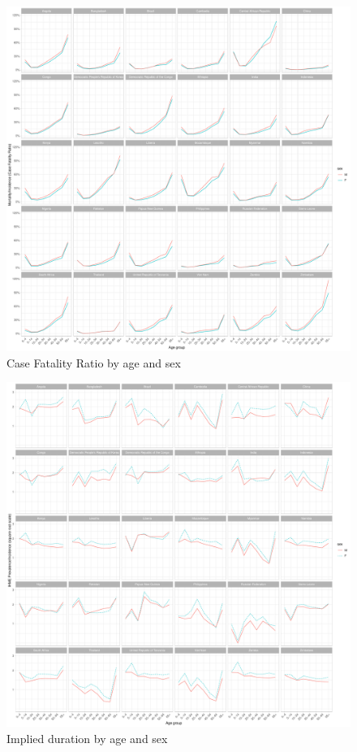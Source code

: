 \documentclass[12pt]{article}
\begin{document}
\FloatBarrier

\begin{figure}
\centering
\includegraphics[width=1\textwidth]{../plots/aF4.pdf}
\caption{Case Fatality Ratio by age and sex}
\end{figure}


\FloatBarrier

\begin{figure}
\centering
\includegraphics[width=1\textwidth]{../plots/aF5.pdf}
\caption{Implied duration by age and sex}
\end{figure}
\end{document}
